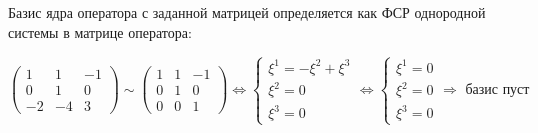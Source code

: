 \documentclass{article}
\begin{document}
\begin{center}
Базис ядра оператора с заданной матрицей определяется как ФСР однородной системы в матрице оператора:
\end{center}
\noindent$$\left(\begin{array}{rrr}1 & 1 & -1 \\ 0 & 1 & 0 \\ -2 & -4 & 3\end{array}\right) \sim \left(\begin{array}{rrr}1 & 1 & -1 \\ 0 & 1 & 0 \\ 0 & 0 & 1\end{array}\right) \Leftrightarrow \begin{cases}
\xi^1= -\xi^2 + \xi^3 \\
\xi^2 = 0 \\
\xi^3 = 0
\end{cases}\Leftrightarrow \begin{cases}
\xi^1= 0 \\
\xi^2 = 0 \\
\xi^3 = 0
\end{cases} \Rightarrow \text{ базис пуст}$$
\end{document}
